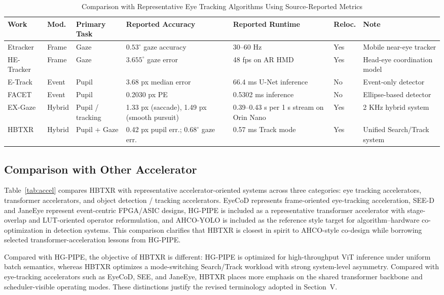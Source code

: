 \documentclass[journal]{IEEEtran}
\begin{document}
\begin{table}[t]
\caption{Comparison with Representative Eye Tracking Algorithms Using Source-Reported Metrics}
\label{tab:prior}
\centering
\footnotesize
\begin{tabular}{p{}p{}p{}p{}p{}p{}p{}}
\toprule
Work & Mod. & Primary Task & Reported Accuracy & Reported Runtime & Reloc. & Note \\
\midrule
Etracker & Frame & Gaze & $0.53^{\circ}$ gaze accuracy & 30--60 Hz & Yes & Mobile near-eye tracker \\
HE-Tracker & Frame & Gaze & $3.655^{\circ}$ gaze error & 48 fps on AR HMD & Yes & Head-eye coordination model \\
E-Track & Event & Pupil & 3.68 px median error & 66.4 ms U-Net inference & No & Event-only detector \\
FACET & Event & Pupil & 0.2030 px PE & 0.5302 ms inference & No & Ellipse-based detector \\
EX-Gaze & Hybrid & Pupil / tracking & 1.33 px (saccade), 1.49 px (smooth pursuit) & 0.39--0.43 s per 1 s stream on Orin Nano & Yes & 2 KHz hybrid system \\
HBTXR & Hybrid & Pupil + Gaze & 0.42 px pupil err.; $0.68^{\circ}$ gaze err. & 0.57 ms Track mode & Yes & Unified Search/Track system \\
\bottomrule
\end{tabular}
\end{table}

\subsection{Comparison with Other Accelerator}
Table~\ref{tab:accel} compares HBTXR with representative accelerator-oriented systems across three categories: eye tracking accelerators, transformer accelerators, and object detection / tracking accelerators. EyeCoD represents frame-oriented eye-tracking acceleration, SEE-D and JaneEye represent event-centric FPGA/ASIC designs, HG-PIPE is included as a representative transformer accelerator with stage-overlap and LUT-oriented operator reformulation, and AHCO-YOLO is included as the reference style target for algorithm--hardware co-optimization in detection systems. This comparison clarifies that HBTXR is closest in spirit to AHCO-style co-design while borrowing selected transformer-acceleration lessons from HG-PIPE.

Compared with HG-PIPE, the objective of HBTXR is different: HG-PIPE is optimized for high-throughput ViT inference under uniform batch semantics, whereas HBTXR optimizes a mode-switching Search/Track workload with strong system-level asymmetry. Compared with eye-tracking accelerators such as EyeCoD, SEE, and JaneEye, HBTXR places more emphasis on the shared transformer backbone and scheduler-visible operating modes. These distinctions justify the revised terminology adopted in Section~V.
\end{document}
